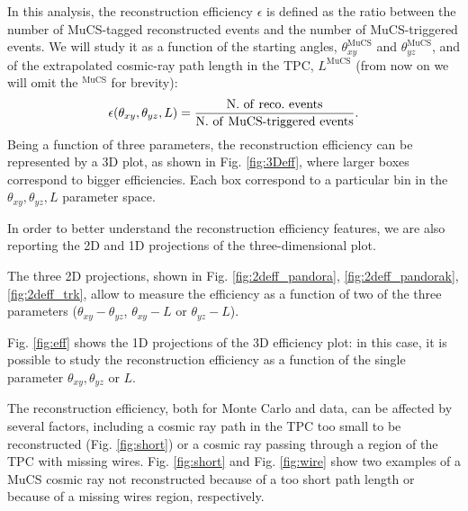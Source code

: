 \documentclass[a4paper]{scrartcl}
\def\mymathhyphen{{\hbox{-}}}
\begin{document}
In this analysis, the reconstruction efficiency $\epsilon$ is defined as the ratio between the number of MuCS-tagged reconstructed events and the number of MuCS-triggered events. We will study it as a function of the starting angles, $\theta_{xy}^{\textrm{MuCS}}$ and $\theta_{yz}^{\textrm{MuCS}}$, and of the extrapolated cosmic-ray path length in the TPC, $L^{\textrm{MuCS}}$ (from now on we will omit the $^{\textrm{MuCS}}$ for brevity):
\begin{equation}
  \epsilon(\theta_{xy}, \theta_{yz}, L) = \frac{\mathrm{N.~of~reco.~events}}{\mathrm{N.~of~MuCS\mymathhyphen triggered~events}}.
\end{equation}
Being a function of three parameters, the reconstruction efficiency can be represented by a 3D plot, as shown in Fig. \ref{fig:3Deff}, where larger boxes correspond to bigger efficiencies. Each box correspond to a particular bin in the $\theta_{xy}, \theta_{yz}, L$ parameter space.

In order to better understand the reconstruction efficiency features, we are also reporting the 2D and 1D projections of the three-dimensional plot.

The three 2D projections, shown in Fig. \ref{fig:2deff_pandora}, \ref{fig:2deff_pandorak}, \ref{fig:2deff_trk}, allow to measure the efficiency as a function of two of the three parameters ($\theta_{xy}-\theta_{yz}$, $\theta_{xy}-L$ or $\theta_{yz}-L$).

Fig. \ref{fig:eff} shows the 1D projections of the 3D efficiency plot: in this case, it is possible to study the reconstruction efficiency as a function of the single parameter $\theta_{xy}, \theta_{yz}$ or $L$.

The reconstruction efficiency, both for Monte Carlo and data, can be affected by several factors, including a cosmic ray path in the TPC too small to be reconstructed (Fig. \ref{fig:short}) or a cosmic ray passing through a region of the TPC with missing wires. Fig. \ref{fig:short} and Fig. \ref{fig:wire} show two examples of a MuCS cosmic ray not reconstructed because of a too short path length or because of a missing wires region, respectively.
\end{document}

